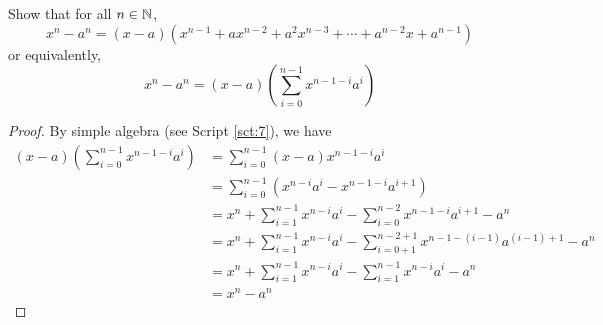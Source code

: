 \documentclass[../main.tex]{subfiles}
\begin{document}
\begin{exercise}\label{exr:12.7}
    Show that for all $n\in\mathbb{N}$,
    \begin{equation*}
        x^n-a^n = (x-a)\left( x^{n-1}+ax^{n-2}+a^2x^{n-3}+\cdots+a^{n-2}x+a^{n-1} \right)
    \end{equation*}
    or equivalently,
    \begin{equation*}
        x^n-a^n = (x-a)\left( \sum_{i=0}^{n-1}x^{n-1-i}a^i \right)
    \end{equation*}
    \begin{proof}
        By simple algebra (see Script \ref{sct:7}), we have
        \begin{align*}
            (x-a)\left( \sum_{i=0}^{n-1}x^{n-1-i}a^i \right) &= \sum_{i=0}^{n-1}(x-a)x^{n-1-i}a^i\\
            &= \sum_{i=0}^{n-1}\left( x^{n-i}a^i-x^{n-1-i}a^{i+1} \right)\\
            &= x^n+\sum_{i=1}^{n-1}x^{n-i}a^i-\sum_{i=0}^{n-2}x^{n-1-i}a^{i+1}-a^n\\
            &= x^n+\sum_{i=1}^{n-1}x^{n-i}a^i-\sum_{i=0+1}^{n-2+1}x^{n-1-(i-1)}a^{(i-1)+1}-a^n\\
            &= x^n+\sum_{i=1}^{n-1}x^{n-i}a^i-\sum_{i=1}^{n-1}x^{n-i}a^i-a^n\\
            &= x^n-a^n
        \end{align*}
    \end{proof}
\end{exercise}
\end{document}
